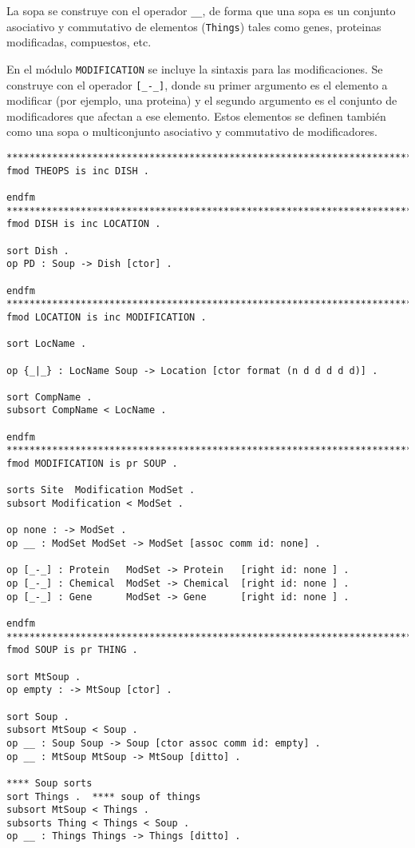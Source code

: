 La sopa se construye con el operador \verb$__$, de forma que una sopa es un conjunto asociativo y commutativo de elementos (\texttt{Things}) tales como genes, proteinas modificadas, compuestos, etc.

En el módulo \texttt{MODIFICATION} se incluye la sintaxis para las modificaciones. Se construye con el operador 
\verb$[_-_]$, donde su primer argumento es el elemento a modificar (por ejemplo, una proteina) y el segundo argumento es el conjunto de modificadores que afectan a ese elemento. Estos elementos se definen también como una sopa o multiconjunto asociativo y commutativo de modificadores.

\begin{lstlisting}[label=THEOPS,language=Maude,caption={Módulo \texttt{THEOPS} y asociados}]
***********************************************************************
fmod THEOPS is inc DISH .

endfm
***********************************************************************
fmod DISH is inc LOCATION .

sort Dish .
op PD : Soup -> Dish [ctor] .

endfm
***********************************************************************
fmod LOCATION is inc MODIFICATION .

sort LocName .

op {_|_} : LocName Soup -> Location [ctor format (n d d d d d)] .

sort CompName .
subsort CompName < LocName .

endfm
***********************************************************************
fmod MODIFICATION is pr SOUP .  
 
sorts Site  Modification ModSet .
subsort Modification < ModSet . 

op none : -> ModSet . 
op __ : ModSet ModSet -> ModSet [assoc comm id: none] . 

op [_-_] : Protein   ModSet -> Protein   [right id: none ] .
op [_-_] : Chemical  ModSet -> Chemical  [right id: none ] .
op [_-_] : Gene      ModSet -> Gene      [right id: none ] .

endfm
***********************************************************************
fmod SOUP is pr THING .

sort MtSoup .
op empty : -> MtSoup [ctor] .  

sort Soup .
subsort MtSoup < Soup .
op __ : Soup Soup -> Soup [ctor assoc comm id: empty] .
op __ : MtSoup MtSoup -> MtSoup [ditto] .

**** Soup sorts
sort Things .  **** soup of things
subsort MtSoup < Things .
subsorts Thing < Things < Soup .
op __ : Things Things -> Things [ditto] .


\end{lstlisting}
